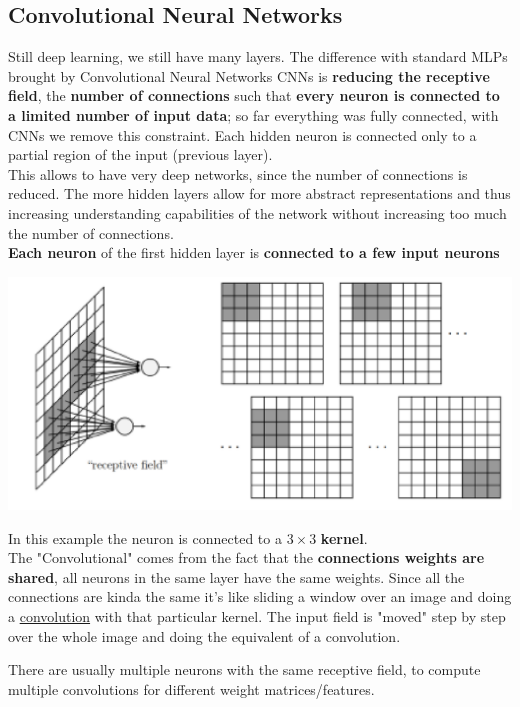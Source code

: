 \documentclass[11pt]{article}
\begin{document}
		\newpage
		
		\subsection{Convolutional Neural Networks}
		Still deep learning, we still have many layers. The difference with standard MLPs brought by Convolutional Neural Networks CNNs is \textbf{reducing the receptive field}, the \textbf{number of connections} such that \textbf{every neuron is connected to a limited number of input data}; so far everything was fully connected, with CNNs we remove this constraint. Each hidden neuron is connected only to a partial region of the input (previous layer).\\
		
		This allows to have very deep networks, since the number of connections is reduced. The more hidden layers allow for more abstract representations and thus increasing understanding capabilities of the network without increasing too much the number of connections.\\
		
		\textbf{Each neuron} of the first hidden layer is \textbf{connected to a few input neurons}
		\begin{center}
			\includegraphics[width=0.7\columnwidth]{img/NN/CNN1}
		\end{center}
		In this example the neuron is connected to a $3 \times 3$ \textbf{kernel}.\\
		
		The "Convolutional" comes from the fact that the \textbf{connections weights are shared}, all neurons in the same layer have the same weights. Since all the connections are kinda the same it's like sliding a window over an image and doing a \href{https://en.wikipedia.org/wiki/Convolution}{convolution} with that particular kernel. The input field is "moved" step by step over the whole image and doing the equivalent of a convolution.\\
		
		\newpage
		
		There are usually multiple neurons with the same receptive field, to compute multiple convolutions for different weight matrices/features.\\
		
\end{document}

